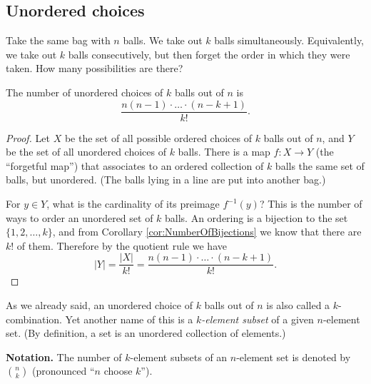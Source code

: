 \begin{page}

\subsection{Unordered choices}
Take the same bag with $n$ balls.
We take out $k$ balls simultaneously.
Equivalently, we take out $k$ balls consecutively, but then forget the order in which they were taken.
How many possibilities are there?


\end{page}

\begin{page}

\begin{thm}
\label{thm:Comb}
The number of unordered choices of $k$ balls out of $n$ is
\[
\frac{n(n-1)\cdot \ldots \cdot (n-k+1)}{k!}.
\]
\end{thm}

\end{page}

\begin{page}

\begin{proof}
Let $X$ be the set of all possible ordered choices of $k$ balls out of $n$,
and $Y$ be the set of all unordered choices of $k$ balls.
There is a map $f \colon X \to Y$ (the ``forgetful map'') that associates to
an ordered collection of $k$ balls the same set of balls, but unordered.
(The balls lying in a line are put into another bag.)

For $y \in Y$, what is the cardinality of its preimage $f^{-1}(y)$?
This is the number of ways to order an unordered set of $k$ balls.
An ordering is a bijection to the set $\{1, 2, \ldots, k\}$, and from Corollary \ref{cor:NumberOfBijections} we know that there are $k!$ of them.
Therefore by the quotient rule we have
\[
|Y| = \frac{|X|}{k!} = \frac{n(n-1)\cdot \ldots \cdot (n-k+1)}{k!}.
\]
\end{proof}

As we already said, an unordered choice of $k$ balls out of $n$ is also called a $k$-combination.
Yet another name of this is a \emph{$k$-element subset} of a given $n$-element set.
(By definition, a set is an unordered collection of elements.)

\smallskip

\noindent\textbf{Notation.}
The number of $k$-element subsets of an $n$-element set is denoted by $\binom{n}{k}$
(pronounced ``$n$ choose $k$'').




\end{page}

